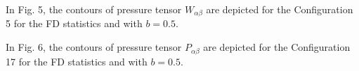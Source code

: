 \documentclass{rsproca}%
\begin{document}
In Fig. 5, the contours of pressure tensor $W_{\alpha \beta}$ are depicted for the Configuration 5 for the FD statistics and with $b=0.5$.


In Fig. 6, the contours of pressure tensor $P_{\alpha \beta}$ are depicted for the Configuration 17 for the FD statistics and with $b=0.5$.
\end{document}
